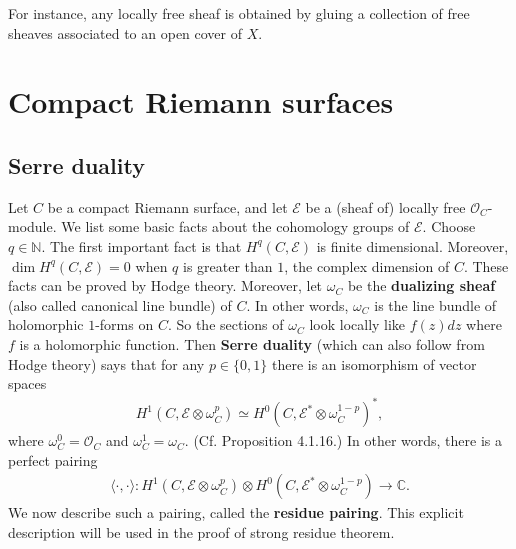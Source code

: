 \documentclass[12pt,b5paper,notitlepage]{report}
\theoremstyle{definition}
\theoremstyle{plain}
\newcommand{\bk}[1]{\langle {#1}\rangle}
\newcommand{\scr}{\mathscr}
\numberwithin{equation}{section}
\begin{document}
For instance, any locally free sheaf is obtained by gluing a collection of free sheaves associated to an open cover of $X$.






\section{Compact Riemann surfaces}\label{lb4}





\subsection*{Serre duality}
 
Let $C$ be a compact Riemann surface, and let $\scr E$ be a (sheaf of) locally free $\scr O_C$-module. We list some basic facts about the cohomology groups of $\scr E$. Choose $q\in\mathbb N$. The first important fact is that $H^q(C,\scr E)$ is finite dimensional. Moreover, $\dim H^q(C,\scr E)=0$ when $q$ is greater than $1$, the complex dimension of $C$. These facts can be proved by Hodge theory. Moreover, let $\omega_C$ be the \textbf{dualizing sheaf} (also called canonical line bundle) of $C$. In other words, $\omega_C$ is the line bundle of holomorphic $1$-forms on $C$. So the sections of $\omega_C$ look locally like $f(z)dz$ where $f$ is a holomorphic function. Then \textbf{Serre duality} (which can also follow from Hodge theory) says that for any $p\in\{0,1\}$ there is an isomorphism of vector spaces
\begin{align}
H^1(C,\scr E\otimes \omega_C^p)\simeq H^0(C,\scr E^*\otimes \omega_C^{1-p})^*,\label{eq2}
\end{align} 
where $\omega_C^0=\scr O_C$ and $\omega_C^1=\omega_C$. (Cf. \cite{Huy06} Proposition 4.1.16.) In other words, there is a perfect pairing
\begin{align}
\bk{\cdot,\cdot}:H^1(C,\scr E\otimes \omega_C^p)\otimes H^0(C,\scr E^*\otimes \omega_C^{1-p})\rightarrow \mathbb C.
\end{align}
We now describe such a pairing, called the \textbf{residue pairing}.  This explicit description will be used in the proof of strong residue theorem.
\end{document}
